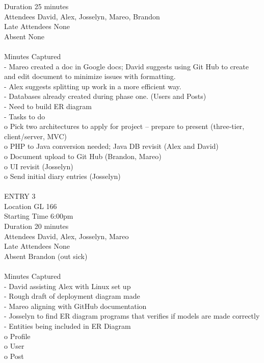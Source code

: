 \documentclass{report}
\begin{document}
Duration		25 minutes\\
Attendees		David, Alex, Josselyn, Mareo, Brandon\\
Late Attendees	None\\
Absent		None\\
\\
Minutes Captured\\
-	Mareo created a doc in Google docs; David suggests using Git Hub to create and edit document to minimize issues with formatting.\\
-	Alex suggests splitting up work in a more efficient way.\\
-	Databases already created during phase one. (Users and Posts)\\
-	Need to build ER diagram\\
-	Tasks to do\\
o	Pick two architectures to apply for project – prepare to present (three-tier, client/server, MVC)\\
o	PHP to Java conversion needed; Java DB revisit (Alex and David)\\
o	Document upload to Git Hub (Brandon, Mareo)\\
o	UI revisit (Josselyn)\\
o	Send initial diary entries (Josselyn)\\
\\
ENTRY 3\\	
Location		GL 166\\
Starting Time		6:00pm\\
Duration		20 minutes\\
Attendees		David, Alex, Josselyn, Mareo\\
Late Attendees	None\\
Absent		Brandon (out sick)\\
\\
Minutes Captured\\
-	David assisting Alex with Linux set up\\
-	Rough draft of deployment diagram made\\
-	Mareo aligning with GitHub documentation\\
-	Josselyn to find ER diagram programs that verifies if models are made correctly\\
-	Entities being included in ER Diagram\\
o	Profile\\
o	User\\
o	Post\\
\end{document}
